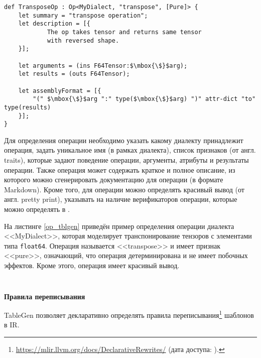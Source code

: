 \begin{lstlisting}[caption={Пример определения операции сложения тензоров, при помощи TableGen.}, label={op_tblgen}, frame=single, mathescape=true]
def TransposeOp : Op<MyDialect, "transpose", [Pure]> {
    let summary = "transpose operation";
    let description = [{
            The op takes tensor and returns same tensor
            with reversed shape.
    }];

    let arguments = (ins F64Tensor:$\mbox{\$}$arg);
    let results = (outs F64Tensor);

    let assemblyFormat = [{
        "(" $\mbox{\$}$arg ":" type($\mbox{\$}$arg) ")" attr-dict "to" type(results)
    }];
}
\end{lstlisting}

Для определения операции необходимо указать какому диалекту принадлежит операция, задать уникальное имя (в рамках диалекта), список признаков (от англ. traits), которые задают поведение операции, аргументы, атрибуты и результаты операции. Также операция может содержать краткое и полное описание, из которого можно сгенерировать документацию для операции (в формате Markdown). Кроме того, для операции можно определять красивый вывод (от англ. pretty print), указывать на наличие верификаторов операции, которые можно определять в \Cpp{}.

На листинге \ref{op_tblgen} приведён пример определения операции диалекта <<MyDialect>>, которая моделирует транспонирование тензоров с элементами типа \texttt{float64}. Операция называется <<transpose>> и имеет признак <<pure>>, означающий, что операция детерминирована и не имеет побочных эффектов. Кроме этого, операция имеет красивый вывод.

\begin{lstlisting}[caption={Пример вывода операции, определённой на листинге \ref{op_tblgen}, без переопределённого вывода.}, frame=single]
%1 = "myDialect.transpose"(%0):(tensor<2x3xf64>)->tensor<3x2xf64>
\end{lstlisting}

\begin{lstlisting}[caption={Пример вывода операции, определённой на листинге \ref{op_tblgen}, с переопределённым выводом.}, frame=single]
%1 = myDialect.transpose(%0 : tensor<2x3xf64>) to tensor<3x2xf64>
\end{lstlisting}

\textbf{Правила переписывания}

TableGen позволяет декларативно определять правила переписывания\footnote{\url{https://mlir.llvm.org/docs/DeclarativeRewrites/} (дата доступа:   ).} шаблонов в IR.

